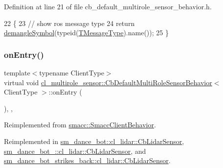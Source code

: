 Definition at line 21 of file cb\+\_\+default\+\_\+multirole\+\_\+sensor\+\_\+behavior.\+h.


\begin{DoxyCode}
22   \{
23     \textcolor{comment}{// show ros message type}
24     \textcolor{keywordflow}{return} \hyperlink{namespacesmacc_1_1introspection_a2f495108db3e57604d8d3ff5ef030302}{demangleSymbol}(\textcolor{keyword}{typeid}(\hyperlink{classcl__multirole__sensor_1_1CbDefaultMultiRoleSensorBehavior_aa23bc8c99de1eddad01d094bdab62aa4}{TMessageType}).name());
25   \}
\end{DoxyCode}
\mbox{\label{classcl__multirole__sensor_1_1CbDefaultMultiRoleSensorBehavior_a5ac29f93cc91e23715f51ade94467cae}} 
\subsubsection{\texorpdfstring{on\+Entry()}{onEntry()}}
{\footnotesize\ttfamily template$<$typename Client\+Type$>$ \\
virtual void \hyperlink{classcl__multirole__sensor_1_1CbDefaultMultiRoleSensorBehavior}{cl\+\_\+multirole\+\_\+sensor\+::\+Cb\+Default\+Multi\+Role\+Sensor\+Behavior}$<$ Client\+Type $>$\+::on\+Entry (\begin{DoxyParamCaption}{ }\end{DoxyParamCaption})\hspace{0.3cm}{\ttfamily [inline]}, {\ttfamily [override]}, {\ttfamily [virtual]}}



Reimplemented from \hyperlink{classsmacc_1_1SmaccClientBehavior_ad5d3e1f1697c3cfe66c94cadba948493}{smacc\+::\+Smacc\+Client\+Behavior}.



Reimplemented in \hyperlink{structsm__dance__bot_1_1cl__lidar_1_1CbLidarSensor_aad3468a6ae78999c9fd01bdb81b42a49}{sm\+\_\+dance\+\_\+bot\+::cl\+\_\+lidar\+::\+Cb\+Lidar\+Sensor}, \hyperlink{structsm__dance__bot__2_1_1cl__lidar_1_1CbLidarSensor_aad4085c114dd98c5e857d1a71c0309f8}{sm\+\_\+dance\+\_\+bot\+\_\+::cl\+\_\+lidar\+::\+Cb\+Lidar\+Sensor}, and \hyperlink{structsm__dance__bot__strikes__back_1_1cl__lidar_1_1CbLidarSensor_a82d0250dcf2d4e9b12ccd528a5d87002}{sm\+\_\+dance\+\_\+bot\+\_\+strikes\+\_\+back\+::cl\+\_\+lidar\+::\+Cb\+Lidar\+Sensor}.



